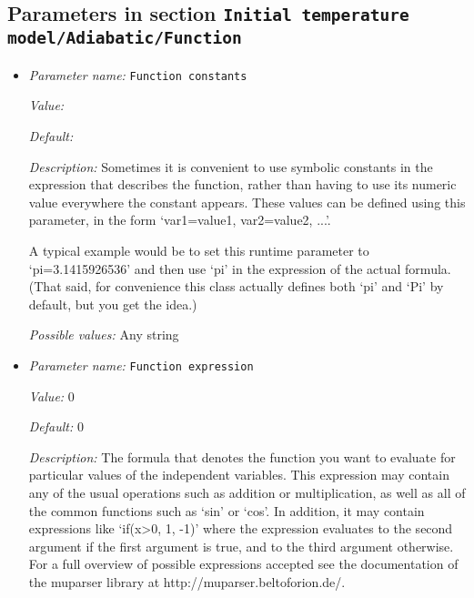 \subsection{Parameters in section \tt Initial temperature model/Adiabatic/Function}
\label{parameters:Initial_20temperature_20model/Adiabatic/Function}

\begin{itemize}
\item {\it Parameter name:} {\tt Function constants}
\label{parameters:Initial temperature model/Adiabatic/Function/Function constants}
\label{parameters:Initial_20temperature_20model/Adiabatic/Function/Function_20constants}


{\it Value:} 


{\it Default:} 


{\it Description:} Sometimes it is convenient to use symbolic constants in the expression that describes the function, rather than having to use its numeric value everywhere the constant appears. These values can be defined using this parameter, in the form `var1=value1, var2=value2, ...'.

A typical example would be to set this runtime parameter to `pi=3.1415926536' and then use `pi' in the expression of the actual formula. (That said, for convenience this class actually defines both `pi' and `Pi' by default, but you get the idea.)


{\it Possible values:} Any string
\item {\it Parameter name:} {\tt Function expression}
\label{parameters:Initial temperature model/Adiabatic/Function/Function expression}
\label{parameters:Initial_20temperature_20model/Adiabatic/Function/Function_20expression}


{\it Value:} 0


{\it Default:} 0


{\it Description:} The formula that denotes the function you want to evaluate for particular values of the independent variables. This expression may contain any of the usual operations such as addition or multiplication, as well as all of the common functions such as `sin' or `cos'. In addition, it may contain expressions like `if(x>0, 1, -1)' where the expression evaluates to the second argument if the first argument is true, and to the third argument otherwise. For a full overview of possible expressions accepted see the documentation of the muparser library at http://muparser.beltoforion.de/.


\end{itemize}
